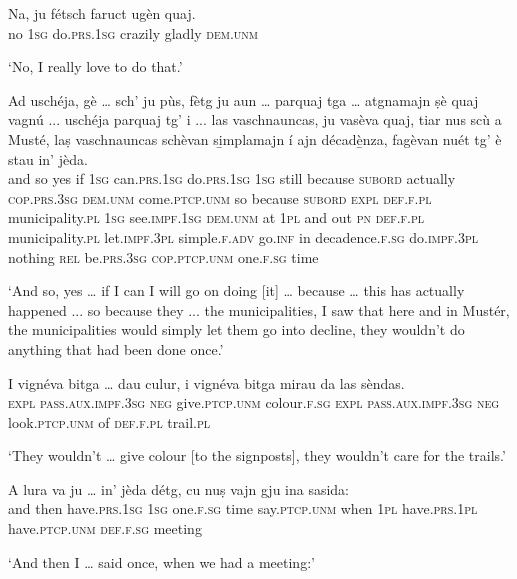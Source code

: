\begin{linenumbers}
\gll Na, ju fétsch faruct ugèn quaj.   \\
no \textsc{1sg} do.\textsc{prs.1sg} crazily gladly \textsc{dem.unm} \\
\end{linenumbers}
\medskip
\glt `No, I really love to do that.'
\medskip

\begin{linenumbers}
\gll  Ad uschéja, gè … sch’ ju pùs, fètg ju aun … parquaj tga … atgnamajn ṣè quaj vagnú ... uschéja parquaj tg' i ... las vaschnauncas, ju vasèva quaj, tiar nus scù a Musté, laṣ vaschnauncas schèvan si̱mplamajn í ajn décadè̱nza, fagèvan nuét tg’ è stau in’ jèda.  \\
and so yes {} if \textsc{1sg} can.\textsc{prs.1sg} do.\textsc{prs.1sg} \textsc{1sg} still {} because \textsc{subord} {} actually \textsc{cop.prs.3sg} \textsc{dem.unm}  come.\textsc{ptcp.unm} {} so because \textsc{subord} \textsc{expl} {} \textsc{def.f.pl} municipality.\textsc{pl} \textsc{1sg} see.\textsc{impf.1sg} \textsc{dem.unm} at \textsc{1pl} and out \textsc{pn} \textsc{def.f.pl} municipality.\textsc{pl} let.\textsc{impf.3pl} simple.\textsc{f.adv}  go.\textsc{inf} in decadence.\textsc{f.sg} do.\textsc{impf.3pl} nothing \textsc{rel} be.\textsc{prs.3sg} \textsc{cop.ptcp.unm} one.\textsc{f.sg} time\\
\end{linenumbers}
\medskip
\glt `And so, yes … if I can I will go on doing [it] … because … this has actually happened ... so because they ... the municipalities, I saw that here and in Mustér, the municipalities would simply let them go into decline, they wouldn’t do anything that had been done once.'
\medskip

\begin{linenumbers}
\gll I vignéva bitga … dau culur, i vignéva bitga mirau da las sèndas.   \\
 \textsc{expl} \textsc{pass.aux.impf.3sg} \textsc{neg} {} give.\textsc{ptcp.unm}  colour.\textsc{f.sg} \textsc{expl} \textsc{pass.aux.impf.3sg} \textsc{neg}  look.\textsc{ptcp.unm} of  \textsc{def.f.pl} trail.\textsc{pl}\\
\end{linenumbers}
\medskip
\glt `They wouldn’t … give colour [to the signposts], they wouldn’t care for the trails.'\medskip

\begin{linenumbers}
\gll  A lura va ju … in’ jèda détg, cu nuṣ vajn gju ina sasida:  \\
and then have.\textsc{prs.1sg} \textsc{1sg} {} one.\textsc{f.sg} time say.\textsc{ptcp.unm} when \textsc{1pl} have.\textsc{prs.1pl} have.\textsc{ptcp.unm} \textsc{def.f.sg} meeting  \\
\end{linenumbers}
\medskip
\glt `And then I … said once, when we had a meeting:'
\medskip

